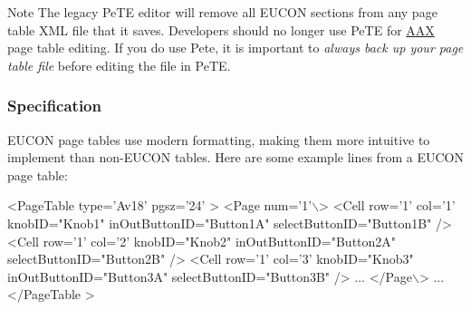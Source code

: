 \begin{DoxyNote}{Note}
The legacy Pe\+T\+E editor will remove all E\+U\+C\+O\+N sections from any page table X\+M\+L file that it saves. Developers should no longer use Pe\+T\+E for \hyperlink{a00288}{A\+A\+X} page table editing. If you do use Pete, it is important to {\itshape always back up your page table file} before editing the file in Pe\+T\+E.
\end{DoxyNote}
\hypertarget{a00363_subsection_eucon_page_tables_specification}{}\subsubsection{Specification}\label{a00363_subsection_eucon_page_tables_specification}
E\+U\+C\+O\+N page tables use modern formatting, making them more intuitive to implement than non-\/\+E\+U\+C\+O\+N tables. Here are some example lines from a E\+U\+C\+O\+N page table\+:


\begin{DoxyCode}
<PageTable type=\textcolor{stringliteral}{'Av18'} pgsz=\textcolor{stringliteral}{'24'} >
  <Page num=\textcolor{charliteral}{'1'}\(\backslash\)>   
    <Cell row=\textcolor{charliteral}{'1'} col=\textcolor{charliteral}{'1'} knobID=\textcolor{stringliteral}{"Knob1"} inOutButtonID=\textcolor{stringliteral}{"Button1A"} selectButtonID=\textcolor{stringliteral}{"Button1B"} />
    <Cell row=\textcolor{charliteral}{'1'} col=\textcolor{charliteral}{'2'} knobID=\textcolor{stringliteral}{"Knob2"} inOutButtonID=\textcolor{stringliteral}{"Button2A"} selectButtonID=\textcolor{stringliteral}{"Button2B"} />
    <Cell row=\textcolor{charliteral}{'1'} col=\textcolor{charliteral}{'3'} knobID=\textcolor{stringliteral}{"Knob3"} inOutButtonID=\textcolor{stringliteral}{"Button3A"} selectButtonID=\textcolor{stringliteral}{"Button3B"} />
    ...
  </Page\(\backslash\)>
  ...
</PageTable >
\end{DoxyCode}



